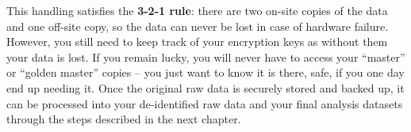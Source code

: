 \noindent This handling satisfies the \textbf{3-2-1 rule}:
there are two on-site copies of the data and one off-site copy,
so the data can never be lost in case of hardware failure.
However, you still need to keep track of your encryption keys as without them your data is lost.
If you remain lucky, you will never have to access your ``master'' or ``golden master'' copies --
you just want to know it is there, safe, if you one day end up needing it.
Once the original raw data is securely stored and backed up,
it can be processed into your de-identified raw data
and your final analysis datasets
through the steps described in the next chapter.
